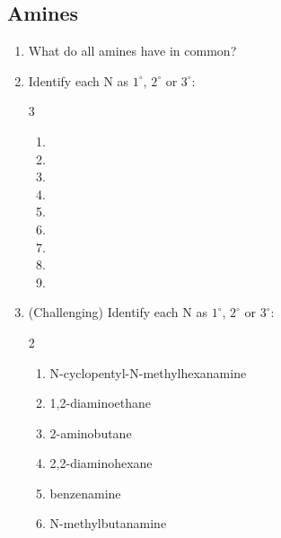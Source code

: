 \documentclass[12pt]{article}
\begin{document}
\begin{center}
    \subsection*{Amines}
\end{center}

\begin{enumerate}[label=\arabic*.]
    \item What do all amines have in common?
    \vspace{1cm}
    \item Identify each N as $1^{\circ}$, $2^{\circ}$ or $3^{\circ}$:
    \begin{multicols}{3}
    \begin{enumerate}[label=\alph*.]
        \item {}
        \item {}
        \item {}
        \item {}
        \item {}
        \item {}
        \item {}
        \item {}
        \item {}
    \end{enumerate}
    \end{multicols}
    \vspace{1cm}
    \item (Challenging) Identify each N as $1^{\circ}$, $2^{\circ}$ or $3^{\circ}$:
    \begin{multicols}{2}
    \begin{enumerate}[label=\alph*.]
        \item N-cyclopentyl-N-methylhexanamine
        \item 1,2-diaminoethane
        \item 2-aminobutane
        \item 2,2-diaminohexane
        \item benzenamine
        \item N-methylbutanamine
    \end{enumerate}
    \end{multicols}

\end{enumerate}
\end{document}
